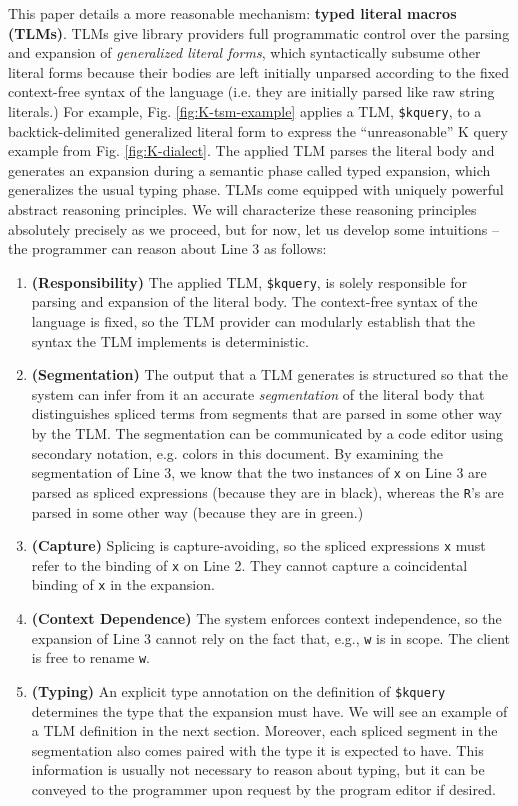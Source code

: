 \documentclass[acmsmall,10pt,review,anonymous]{acmart}\settopmatter{printfolios=true}
\newcommand{\li}[1]{\lstinline{#1}}
\begin{document}
This paper details a more reasonable mechanism: \textbf{typed literal macros (TLMs)}. TLMs give library providers full programmatic control over the parsing and expansion of \emph{generalized literal forms}, which syntactically subsume other literal forms because their bodies are left initially unparsed according to the fixed context-free syntax of the language (i.e. they are initially parsed like raw string literals.) For example, Fig. \ref{fig:K-tsm-example} applies a TLM, \li{$kquery}, to a backtick-delimited generalized literal form to express the ``unreasonable'' K query example from Fig. \ref{fig:K-dialect}. The applied TLM parses the literal body and generates an expansion during a semantic phase called typed expansion, which generalizes the usual typing phase.  TLMs come equipped with uniquely powerful abstract reasoning principles. We will characterize these reasoning principles absolutely precisely as we proceed, but for now, let us develop some intuitions -- the programmer can reason about Line 3 as follows:
\begin{enumerate}
\item \textbf{(Responsibility)} The applied TLM, \li{$kquery}, is solely responsible for parsing and expansion of the literal body. The context-free syntax of the language is fixed, so the TLM provider can modularly establish that the syntax the TLM implements is deterministic.
\item \textbf{(Segmentation)} The output that a TLM generates is structured so that the system can infer from it an accurate \emph{segmentation} of the literal body that distinguishes spliced terms from segments that are parsed in some other way by the TLM. The segmentation can be communicated by a code editor using secondary notation, e.g. colors in this document. By examining the segmentation of Line 3, we know that the two instances of \li{x} on Line 3 are parsed as spliced expressions (because they are in black), whereas the \li{R}'s are parsed in some other way (because they are in green.)
\item \textbf{(Capture)} Splicing is capture-avoiding, so the spliced expressions \li{x} must refer to the binding of \li{x} on Line 2. They cannot capture a coincidental binding of \li{x} in the expansion.
\item \textbf{(Context Dependence)} The system enforces context independence, so the expansion of Line 3 cannot  rely on the fact that, e.g., \li{w} is in scope. The client is free to rename \li{w}.
\item \textbf{(Typing)} An explicit type annotation on the definition of \li{$kquery} determines the type that the expansion must have. We will see an example of a TLM definition in the next section. Moreover, each spliced segment in the segmentation also comes paired with the type it is expected to have. This information is usually not necessary to reason about typing, but it can be conveyed to the programmer upon request by the program editor if desired. %
\end{enumerate}
\end{document}
